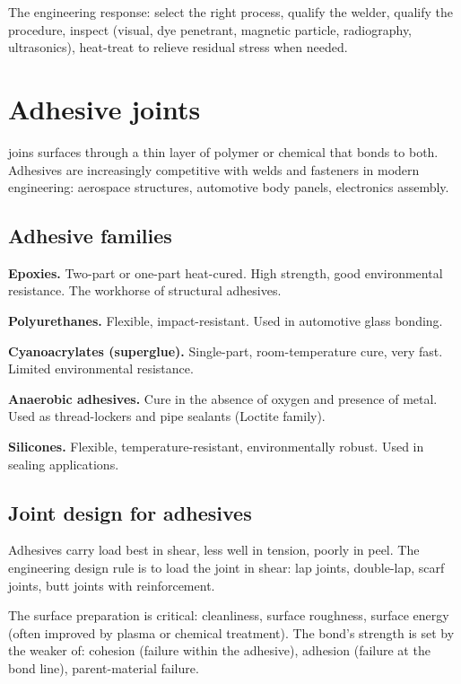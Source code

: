 The engineering response: select the right process, qualify the welder, qualify the procedure, inspect (visual, dye penetrant, magnetic particle, radiography, ultrasonics), heat-treat to relieve residual stress when needed.

\section{Adhesive joints}

 joins surfaces through a thin layer of polymer or chemical that bonds to both. Adhesives are increasingly competitive with welds and fasteners in modern engineering: aerospace structures, automotive body panels, electronics assembly.

\subsection{Adhesive families}

\textbf{Epoxies.} Two-part or one-part heat-cured. High strength, good environmental resistance. The workhorse of structural adhesives.

\textbf{Polyurethanes.} Flexible, impact-resistant. Used in automotive glass bonding.

\textbf{Cyanoacrylates (superglue).} Single-part, room-temperature cure, very fast. Limited environmental resistance.

\textbf{Anaerobic adhesives.} Cure in the absence of oxygen and presence of metal. Used as thread-lockers and pipe sealants (Loctite family).

\textbf{Silicones.} Flexible, temperature-resistant, environmentally robust. Used in sealing applications.

\subsection{Joint design for adhesives}

Adhesives carry load best in shear, less well in tension, poorly in peel. The engineering design rule is to load the joint in shear: lap joints, double-lap, scarf joints, butt joints with reinforcement.

The surface preparation is critical: cleanliness, surface roughness, surface energy (often improved by plasma or chemical treatment). The bond's strength is set by the weaker of: cohesion (failure within the adhesive), adhesion (failure at the bond line), parent-material failure.

